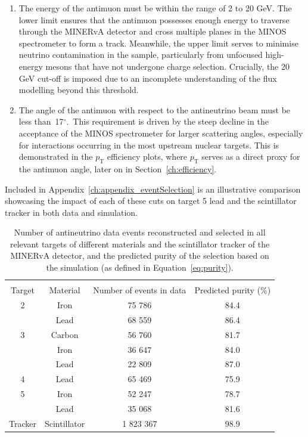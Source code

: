\begin{enumerate}
    \item The energy of the antimuon must be within the range of 2 to 20 GeV. The lower limit ensures that the antimuon possesses enough energy to traverse through the MINERvA detector and cross multiple planes in the MINOS spectrometer to form a track. Meanwhile, the upper limit serves to minimise neutrino contamination in the sample, particularly from unfocused high-energy mesons that have not undergone charge selection. Crucially, the 20 GeV cut-off is imposed due to an incomplete understanding of the flux modelling beyond this threshold.
    \item The angle of the antimuon with respect to the antineutrino beam must be less than~17$^\circ$.~This requirement is driven by the steep decline in the acceptance of the MINOS spectrometer for larger scattering angles, especially for interactions occurring in the most upstream nuclear targets. This is demonstrated in the $p_{\text{T}}$ efficiency plots, where $p_{\text{T}}$ serves as a direct proxy for the antimuon angle, later on in Section~\ref{ch:efficiency}.   
\end{enumerate}
Included in Appendix~\ref{ch:appendix_eventSelection} is an illustrative comparison showcasing the impact of each of these cuts on target 5 lead and the scintillator tracker in both data and simulation.

\begin{table}[b!]
    \centering

    \begin{tabular}{c c c c}
    \hline \\ [-1.5 ex]
    Target & Material & Number of events in data & Predicted purity (\%) \\ [0.5ex] %
    \hline
    \hline
    2 & Iron & 75 786 & 84.4 \\
      & Lead & 68 559 & 86.4 \\
    \hline
    3 & Carbon & 56 760 & 81.7 \\
      & Iron & 36 647 & 84.0 \\
      & Lead & 22 809 & 87.0 \\
    \hline
    4 & Lead & 65 469 & 75.9 \\
    \hline
    5 & Iron & 52 247 & 78.7\\
      & Lead & 35 068 & 81.6 \\
    \hline
    Tracker & Scintillator & 1 823 367 & 98.9 \\
    \hline
    \end{tabular}

    \caption{Number of antineutrino data events reconstructed and selected in all relevant targets of different materials and the scintillator tracker of the MINERvA detector, and the predicted purity of the selection based on the simulation (as defined in Equation~\ref{eq:purity}).}
    \label{table:selectedEvents}
\end{table}


